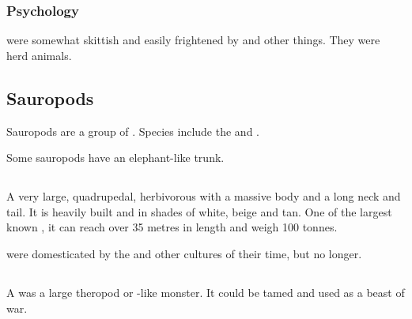 \subsubsection{Psychology}
\Relcs were somewhat skittish and easily frightened by  and other things. 
They were herd animals.















\subsection{Sauropods}
Sauropods are a group of \saurians{}. 
Species include the \brukath{} and \tondra. 

Some sauropods have an elephant-like trunk. 















\subsection{\Tondra}
\index{\tondra}
A very large, quadrupedal, herbivorous  with a massive body and a long neck and tail. 
It is heavily built and \coloured in shades of white, beige and tan. 
One of the largest known \saurians{}, it can reach over 35 metres in length and weigh 100 tonnes. 

\Tondras{} were domesticated by the  and other cultures of their time, but no longer. 
















\subsection{\Varcal}
\index{\varcal}
A \varcal was a large theropod or \dragon-like monster.
It could be tamed and used as a beast of war.
















